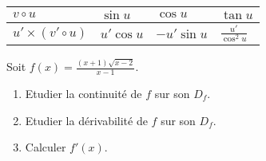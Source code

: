 \bigskip
\begin{tabularx}{\textwidth}{|X|X|X|X|}
\hline
  $ v\circ u $ & $ \sin u $ & $ \cos u $ & $ \tan u $\\
\hline
$ u'\times (v'\circ u) $  & $ u'\cos u $ & $-u'\sin u$ & $ \frac{u'}{\cos^{2}u}$  \\     
 \hline
\end{tabularx}



\begin{exercice}
Soit $ f (x)=\frac{(x+1)\sqrt{x-2}}{x-1}.$
 \begin{enumerate}
\item Etudier la continuité  de $ f $ sur son $D_{f}$.
\item Etudier  la dérivabilité de $ f $ sur son $D_{f}$.
\item Calculer $ f'(x). $
\end{enumerate}
\end{exercice}
